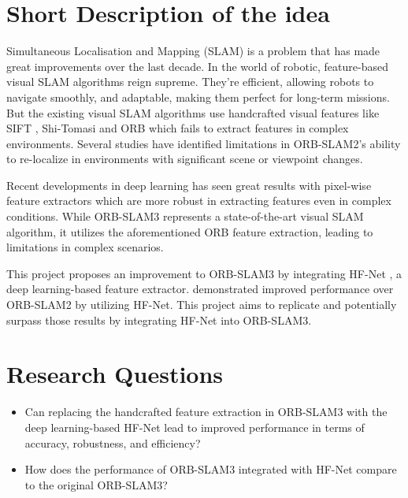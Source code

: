\documentclass[a4paper,12pt]{article}
\begin{document}
\section*{Short Description of the idea}
\begin{spacing}{1}
    Simultaneous Localisation and Mapping (SLAM) is a problem that has made great improvements over the last decade. In the world of robotic,
 feature-based visual SLAM algorithms reign supreme. They're efficient, allowing robots to navigate smoothly, and adaptable, making them perfect for long-term missions. But the existing visual SLAM algorithms use handcrafted visual features like SIFT \citep{lowe2004distinctive}, Shi-Tomasi \citep{323794} and ORB \citep{ethan2011orb} which fails to extract features in complex environments. Several studies \citep{mur2017orb,shi2020we} have identified limitations in ORB-SLAM2's ability to re-localize in environments with significant scene or viewpoint changes.

 Recent developments in deep learning has seen great results with pixel-wise feature extractors \citep{detone2018superpoint,dusmanu2019d2,tang2019gcnv2} which are more robust in extracting features even in complex conditions. While ORB-SLAM3 \citep{campos2021orb} represents a state-of-the-art visual SLAM algorithm, it utilizes the aforementioned ORB feature extraction, leading to limitations in complex scenarios.

 This project proposes an improvement to ORB-SLAM3 by integrating HF-Net \citep{sarlin2019coarse}, a deep learning-based feature extractor. \textcite{li2020dxslam} demonstrated improved performance over ORB-SLAM2 by utilizing HF-Net. This project aims to replicate and potentially surpass those results by integrating HF-Net into ORB-SLAM3.
\end{spacing}

\section*{Research Questions}
\begin{itemize}
    \item Can replacing the handcrafted feature extraction in ORB-SLAM3 with the deep learning-based HF-Net lead to improved performance in terms of accuracy, robustness, and efficiency?
    \item How does the performance of ORB-SLAM3 integrated with HF-Net compare to the original ORB-SLAM3?
\end{itemize}
\end{document}
